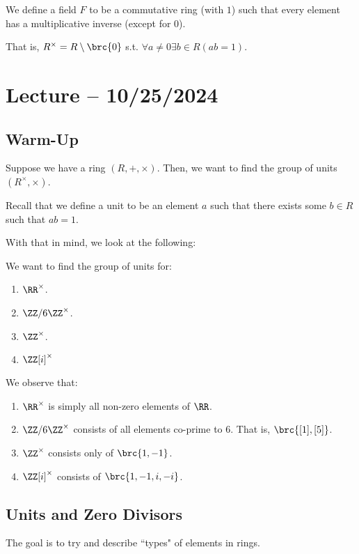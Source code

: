 \documentclass[openany]{book}
\begin{document}
\begin{defn}[Fields]
	We define a field $F$ to be a commutative ring (with $1$) such that every element has a multiplicative inverse (except for $0$).
	
	That is, $R^{\times} = R \setminus \brc{0}$ s.t. $\forall a \neq 0 \exists b \in R (ab = 1)$.
\end{defn}

\section{Lecture -- 10/25/2024}
\subsection{Warm-Up}
Suppose we have a ring $(R, +, \times)$. Then, we want to find the group of units $(R^{\times}, \times)$.

Recall that we define a unit to be an element $a$ such that there exists some $b \in R$ such that $ab = 1$.

With that in mind, we look at the following:
\begin{hw}
	We want to find the group of units for:
	\begin{enumerate}
		\item $\RR^{\times}$.
		\item $\ZZ/6\ZZ^{\times}$.
		\item $\ZZ^{\times}$.
		\item $\ZZ[i]^{\times}$
	\end{enumerate}
\end{hw}
\begin{solution}
	We observe that:
	\begin{enumerate}
		\item $\RR^{\times}$ is simply all non-zero elements of $\RR$.
		\item $\ZZ/6\ZZ^{\times}$ consists of all elements co-prime to $6$. That is, $\brc{[1], [5]}$.
		\item $\ZZ^{\times}$ consists only of $\brc{1, -1}$.
		\item $\ZZ[i]^{\times}$ consists of $\brc{1, -1, i, -i}$.
	\end{enumerate}
\end{solution}

\subsection{Units and Zero Divisors}
The goal is to try and describe ``types" of elements in rings.
\end{document}
